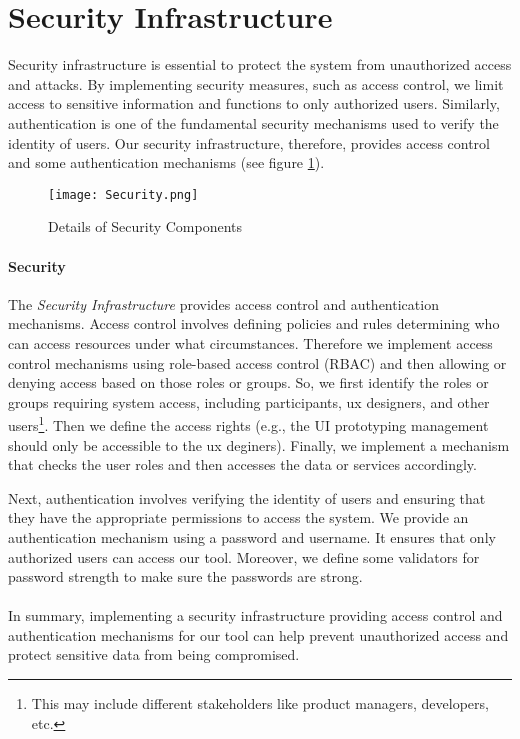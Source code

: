 \clearpage
\section{Security Infrastructure}
\label{sc:section:security}
Security infrastructure is essential to protect the system from unauthorized access and attacks. 
By implementing security measures, such as access control, we limit access to sensitive information and functions to only authorized users.
Similarly, authentication is one of the fundamental security mechanisms used to verify the identity of users.
Our security infrastructure, therefore, provides access control and some authentication mechanisms (see figure \ref{fig:sc:security}).

\begin{figure}[htbp!]
    \centering    
    \texttt{[image: Security.png]} 
    \caption[Details of Security Components]{Details of Security Components}
    \label{fig:sc:security}
\end{figure}

\paragraph{Security}
The \textit{Security Infrastructure} provides access control and authentication mechanisms.
Access control involves defining policies and rules determining who can access resources under what circumstances.
Therefore we implement access control mechanisms using role-based access control (RBAC) and then allowing or denying access based on those roles or groups.
So, we first identify the roles or groups requiring system access, including participants, \ac{ux} designers, and other users\footnote{This may include different stakeholders like product managers, developers, etc.}. 
Then we define the access rights (e.g., the UI prototyping management should only be accessible to the \ac{ux} deginers).
Finally, we implement a mechanism that checks the user roles and then accesses the data or services accordingly. 

Next, authentication involves verifying the identity of users and ensuring that they have the appropriate permissions to access the system.
We provide an authentication mechanism using a password and username. 
It ensures that only authorized users can access our tool.
Moreover, we define some validators for password strength to make sure the passwords are strong.\\\\
In summary, implementing a security infrastructure providing access control and authentication mechanisms for our tool can help prevent unauthorized access and protect sensitive data from being compromised.

\clearpage